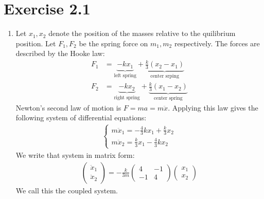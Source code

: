 \documentclass{article}
\theoremstyle{named}
\begin{document}
\section*{Exercise 2.1}
\begin{enumerate}[label=(\roman*)]
	\item Let $x_1,x_2$ denote the position of the masses relative to the quilibrium position. Let $F_1, F_2$ be the spring force on $m_1,m_2$ respectively. The forces are described by the Hooke law:
	\begin{align*}
		F_1 &= \underbrace{-kx_1}_{\text{left spring}} + \underbrace{\frac{k}{3}(x_2-x_1)}_{\text{center srping}} \\
		F_2 &= \underbrace{-kx_2 }_{\text{right spring}}+ \underbrace{\frac{k}{3}(x_1-x_2)}_{\text{center spring}}
	\end{align*}
	Newton's second law of motion is $F = ma = m \ddot x$. Applying this law gives the following system of differential equations:
	\begin{align*}
		\begin{cases}
			m\ddot x_1 = - \frac{4}{3}kx_1+\frac{k}{3}x_2 \\
			m\ddot x_2 = \frac{k}{3}x_1 - \frac{4}{3}kx_2 
		\end{cases}
	\end{align*}
	We write that system in matrix form:
	\begin{align}\label{linux}
		\begin{pmatrix}
			\ddot x_1 \\ \ddot x_2
		\end{pmatrix}
		=
		-\frac{k}{3m}\begin{pmatrix}
		4 & -1 \\ -1 & 4
		\end{pmatrix} \begin{pmatrix}
		x_1 \\ x_2
		\end{pmatrix}
	\end{align}
	We call this the coupled system.
	

\end{enumerate}
\end{document}
